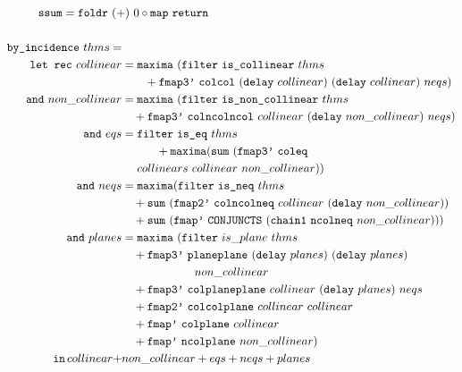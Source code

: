 \begin{figure}
\small
\begin{align*}
&\hspace{-2.55cm}\code{ssum} = \code{foldr}\ (+)\  0\circ \code{map}\ \code{return}\\\\
\code{by\_incidence}\ thms = \\
\quad \code{let rec}\ collinear &= \code{maxima}\ (\code{filter}\ \code{is\_collinear}\ thms\\
&\qquad + \code{fmap3'}\ \code{colcol}\ (\code{delay}\ collinear)\ (\code{delay}\ collinear)\ neqs)\\
\code{and}\ non\_collinear &= \code{maxima}\ (\code{filter}\ \code{is\_non\_collinear}\ thms\\
&\quad + \code{fmap3'}\ \code{colncolncol}\ collinear\ (\code{delay}\ non\_collinear)\ neqs)\\
\code{and}\ eqs &= \code{filter}\ \code{is\_eq}\ thms\\
&\quad\qquad+ \code{maxima} (\code{sum}\ (\code{fmap3'}\ \code{coleq}\\
&\quad\ collinears\ collinear\ non\_collinear))\\
\code{and}\ neqs &= \code{maxima} (\code{filter}\ \code{is\_neq}\ thms\\
&\quad + \code{sum}\ (\code{fmap2'}\ \code{colncolneq}\ collinear\ (\code{delay}\ non\_collinear))\\
&\quad + \code{sum}\ (\code{fmap'}\ \code{CONJUNCTS}\ (\code{chain1}\ \code{ncolneq}\ non\_collinear)))\\
\code{and}\ planes &= \code{maxima}\ (\code{filter}\ is\_plane\ thms\\
&\quad + \code{fmap3'}\ \code{planeplane}\ (\code{delay}\ planes)\ (\code{delay}\ planes)\\
&\qquad\qquad\qquad\ non\_collinear\\
&\quad + \code{fmap3'}\ \code{colplaneplane}\ collinear\ (\code{delay}\ planes)\ neqs\\
&\quad+ \code{fmap2'}\ \code{colcolplane}\ collinear\ collinear\\
&\quad+ \code{fmap'}\ \code{colplane}\ collinear\\
&\quad+ \code{fmap'}\ \code{ncolplane}\ non\_collinear)\\
\quad \code{in}\,collinear + &non\_collinear + eqs + neqs + planes

\end{align*}
\end{figure}
